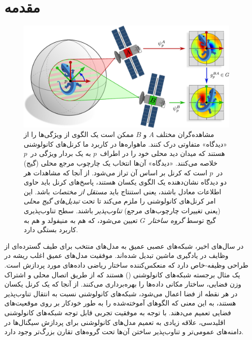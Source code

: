 

\section{مقدمه}


\begin{figure}
	\centering
	\vspace*{-2ex}
	\includegraphics[width=.94\textwidth]{figures/satellite_kernels.pdf}
	\caption{\small
		مشاهده‌گران مختلف $A$ و $B$ ممکن است یک الگوی از ویژگی‌ها را از «دیدگاه» متفاوتی درک کنند.
		ماهواره‌ها در کاربرد ما کرنل‌های کانولوشنی هستند که میدان دید محلی خود را در اطراف~$p$ به یک بردار ویژگی در~$p$ خلاصه می‌کنند.
		«دیدگاه» آن‌ها انتخاب یک چارچوب مرجع محلی (گیج) در~$p$ است که کرنل بر اساس آن تراز می‌شود.
		از آنجا که مشاهدات هر دو دیدگاه نشان‌دهنده یک الگوی یکسان هستند، پاسخ‌های کرنل باید حاوی اطلاعات معادل باشند، یعنی استنتاج باید \emph{مستقل از مختصات} باشد.
		این امر کرنل‌های کانولوشنی را ملزم می‌کند تا تحت \emph{تبدیل‌های گیج محلی} (یعنی تغییرات چارچوب‌های مرجع) \emph{تناوب‌پذیر} باشند.
		سطح تناوب‌پذیری گیج توسط \emph{گروه ساختار}~$G$ تعیین می‌شود، که هم به منیفولد و هم به کاربرد بستگی دارد.
		{\\
			\color{gray}
		}
	}
	\label{fig:satellite}
\end{figure}


در سال‌های اخیر، شبکه‌های عصبی عمیق به مدل‌های منتخب برای طیف گسترده‌ای از وظایف در یادگیری ماشین تبدیل شده‌اند.
موفقیت مدل‌های عمیق اغلب ریشه در طراحی وظیفه-خاص دارد که منعکس‌کننده ساختار ریاضی داده‌های مورد پردازش است.
یک مثال برجسته شبکه‌های کانولوشنی (\CNN) هستند که از طریق اتصال محلی و اشتراک وزن فضایی، ساختار مکانی داده‌ها را بهره‌برداری می‌کنند.
از آنجا که یک کرنل یکسان در هر نقطه از فضا اعمال می‌شود، شبکه‌های کانولوشنی نسبت به انتقال تناوب‌پذیر هستند، به این معنی که الگوهای آموخته‌شده را به طور خودکار بر روی موقعیت‌های فضایی تعمیم می‌دهند.
با توجه به موفقیت تجربی قابل توجه شبکه‌های کانولوشنی اقلیدسی، علاقه زیادی به تعمیم مدل‌های کانولوشنی برای پردازش سیگنال‌ها در دامنه‌های عمومی‌تر و تناوب‌پذیر ساختن آن‌ها تحت گروه‌های تقارن بزرگ‌تر وجود دارد.


